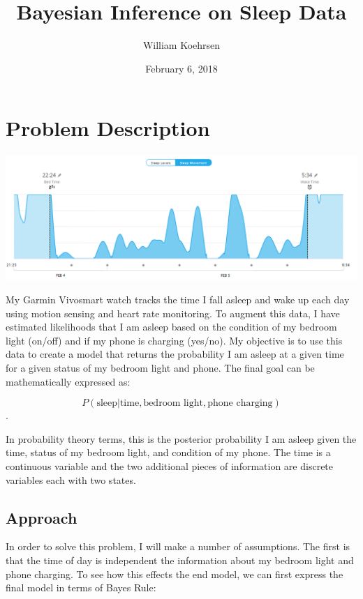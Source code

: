 \documentclass[12pt]{article}
\title{Bayesian Inference on Sleep Data}
\author{William Koehrsen}
\date{February 6, 2018}
\makeatletter
\def\maxwidth{\ifdim\Gin@nat@width>\linewidth\linewidth
    \else\Gin@nat@width\fi}
\let\Oldincludegraphics\includegraphics
\renewcommand{\includegraphics}[1]{\Oldincludegraphics[width=.8\maxwidth]{#1}}
\makeatother
\begin{document}
    
    
    \maketitle
    \tableofcontents
    

    
    \hypertarget{problem-description}{%
\section{Problem Description}\label{problem-description}}

\includegraphics{images/sleep_data_graph.PNG}

My Garmin Vivosmart watch tracks the time I fall asleep and wake up each
day using motion sensing and heart rate monitoring. To augment this
data, I have estimated likelihoods that I am asleep based on the
condition of my bedroom light (on/off) and if my phone is charging
(yes/no). My objective is to use this data to create a model that
returns the probability I am asleep at a given time for a given status
of my bedroom light and phone. The final goal can be mathematically
expressed as:

\[P(\text{sleep} | \text{time}, \text{bedroom light}, \text{phone charging})\].

In probability theory terms, this is the posterior probability I am
asleep given the time, status of my bedroom light, and condition of my
phone. The time is a continuous variable and the two additional pieces
of information are discrete variables each with two states.

    \hypertarget{approach}{%
\subsection{Approach}\label{approach}}

In order to solve this problem, I will make a number of assumptions. The
first is that the time of day is independent the information about my
bedroom light and phone charging. To see how this effects the end model,
we can first express the final model in terms of Bayes Rule:
\end{document}
